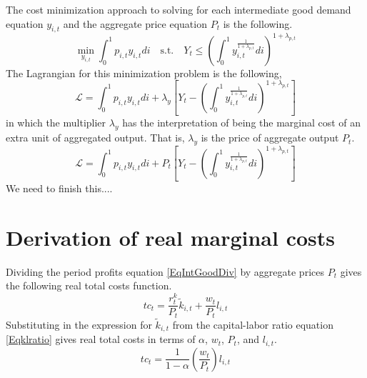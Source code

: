 \documentclass[article,11pt,letterpaper,fleqn]{article}
\theoremstyle{definition}
\numberwithin{equation}{section}
\begin{document}
{The cost minimization approach to solving for each intermediate good demand equation $y_{i,t}$ and the aggregate price equation $P_t$ is the following.
\begin{equation}\label{TAppEqObjCostMin}
   \min_{y_{i,t}} \int_{0}^{1}p_{i,t}y_{i,t}di \quad\text{s.t.}\quad Y_t \leq \left(\int_{0}^{1} y_{i,t}^{\frac{1}{1+\lambda_{p,t}}}di\right)^{1+\lambda_{p,t}}
\end{equation}
The Lagrangian for this minimization problem is the following,
\begin{equation}\label{TAppEqLagrCostMin}
   \mathcal{L} = \int_{0}^{1}p_{i,t}y_{i,t}di + \lambda_y\left[Y_t - \left(\int_{0}^{1} y_{i,t}^{\frac{1}{1+\lambda_{p,t}}}di\right)^{1+\lambda_{p,t}}\right]
\end{equation}
in which the multiplier $\lambda_y$ has the interpretation of being the marginal cost of an extra unit of aggregated output. That is, $\lambda_y$ is the price of aggregate output $P_t$.
\begin{equation}\label{TAppEqLagrCostMin2}
   \mathcal{L} = \int_{0}^{1}p_{i,t}y_{i,t}di + P_t\left[Y_t - \left(\int_{0}^{1} y_{i,t}^{\frac{1}{1+\lambda_{p,t}}}di\right)^{1+\lambda_{p,t}}\right]
\end{equation}
We need to finish this....


\newpage
\setcounter{equation}{0} %
\section{Derivation of real marginal costs}\label{TAppRealMC}

Dividing the period profits equation \eqref{EqIntGoodDiv} by aggregate prices $P_t$ gives the following real total costs function.
\begin{equation}\label{TAppEqRealTC}
   tc_t = \frac{r_t^k}{P_t}\tilde{k}_{i,t} + \frac{w_t}{P_t}l_{i,t}
\end{equation}
Substituting in the expression for $\tilde{k}_{i,t}$ from the capital-labor ratio equation \eqref{Eqklratio} gives real total costs in terms of $\alpha$, $w_t$, $P_t$, and $l_{i,t}$.
\begin{equation}\label{TAppEqRealTCl}
   tc_t = \frac{1}{1-\alpha}\left(\frac{w_t}{P_t}\right)l_{i,t}
\end{equation}

}
\end{document}
